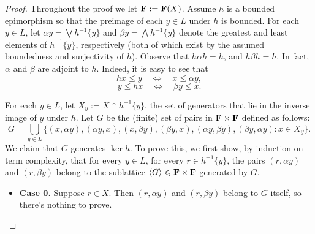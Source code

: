 \begin{proof} Throughout the proof we let $\mathbf{F}:= \mathbf{F} (X)$.
Assume $h$ is a bounded epimorphism so that the preimage of each 
$y\in L$ under $h$ is bounded.  For each $y\in L$, let 
$\alpha y= \bigvee h^{-1}\{y\}$ and $\beta y = \bigwedge h^{-1}\{y\}$ 
denote the greatest and least elements of $h^{-1}\{y\}$, respectively 
(both of which exist by the assumed boundedness and surjectivity of $h$).  
Observe that $h \alpha h = h$, and $h \beta h = h$. In fact, $\alpha$ 
and $\beta$ are adjoint to $h$. Indeed, it is easy to see that
\[
h x \leqslant y \quad \Leftrightarrow \quad x \leqslant \alpha y,
\]
\[
y \leqslant h x \quad \Leftrightarrow \quad \beta y \leqslant x.
\]

For each $y \in L$, let $X_y := X\cap h^{-1}\{y\}$, the set of generators 
that lie in the inverse image of $y$ under $h$.
Let $G$ be the (finite) set of pairs in $\mathbf{F} \times \mathbf{F}$ defined 
as follows:
\[
G = \bigcup_{y \in L}\{(x, \alpha y), (\alpha y, x), (x, \beta y), 
                       (\beta y, x), (\alpha y, \beta y), 
                       (\beta y, \alpha y) : x \in X_y\}.
\]
We claim that $G$ generates $\ker h$.  To prove this, we first show, by 
induction on term complexity, that for every $y \in L$, for every 
$r \in h^{-1}\{y\}$, the pairs $(r,\alpha y)$ and $(r,\beta y)$ belong 
to the sublattice $\langle G \rangle \leqslant \mathbf{F} \times \mathbf{F}$ 
generated by $G$.

\begin{itemize}
  \item {\bf Case 0.} Suppose $r \in X$. Then $(r,\alpha y)$ and $(r,\beta y)$ 
  belong to $G$ itself, so there's nothing to prove.  


\end{itemize}
\end{proof}
